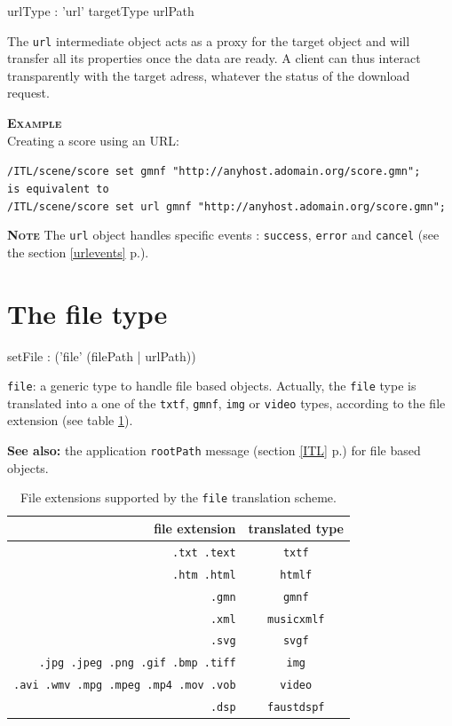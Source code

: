 \documentclass[a4paper,twoside]{report}
\newcommand{\sublevel}[1]	{\section{#1}}
\newcommand{\fullref}[1]	{\ref{#1} p.\pageref{#1}}
\newcommand{\OSC}[1]		{\texttt{#1}}
\newcommand{\example}		{\textbf{\hspace{-1.5cm}\textbf{\textsc{Example }}}}
\newcommand{\note}	[1]		{\vspace{2mm}\textbf{\hspace{-1.03cm}\textbf{\textsc{Note #1}}}}
\renewcommand{\seealso}		{\textbf{See also: }}
\let\olditemize\itemize
\let\oldenditemize\enditemize
\renewenvironment{itemize} 	{\olditemize \setlength{\itemsep}{1mm}}{\oldenditemize}
\newcommand{\sample}	[1]			{\vspace{-2mm}\begin{center}\colorbox{mygrey}{
								\begin{minipage}[t]{0.9\columnwidth} 
								{\small \texttt{#1}}
								\end{minipage}}\end{center}}
\begin{document}
\begin{rail}
urlType : 
	'url' targetType  urlPath
\end{rail}

The \OSC{url} intermediate object acts as a proxy for the target object and will transfer all its properties once the data are ready. A client can thus interact transparently with the target adress, whatever the status of the download request.

\example \\
Creating a score using an URL:
\sample{/ITL/scene/score set gmnf "http://anyhost.adomain.org/score.gmn"; \\
\hspace*{4mm} is equivalent to \\
/ITL/scene/score set url gmnf "http://anyhost.adomain.org/score.gmn";
}

\note{} The \OSC{url} object handles specific events : \OSC{success}, \OSC{error} and \OSC{cancel} (see the section \fullref{urlevents}).


\sublevel{The file type}
\label{fileset}

\label{setfile}
\begin{rail}
setFile : 
	('file' (filePath | urlPath))
\end{rail}

\begin{itemize}
\item \OSC{file}: a generic type to handle file based objects. Actually, the \OSC{file} type is translated into a one of the \OSC{txtf}, \OSC{gmnf}, \OSC{img} or \OSC{video} types, according to the file extension (see table \ref{fileTranslate}).
\end{itemize}

\seealso the application \OSC{rootPath} message (section \fullref{ITL}) for file based objects.

\begin{table}[htdp]
\caption{File extensions supported by the \OSC{file} translation scheme.}
\begin{center}
\begin{tabular}{|r|c|}
\hline
file extension & translated type \\
\hline
\OSC{.txt .text}		& \OSC{txtf} \\
\OSC{.htm .html}		& \OSC{htmlf} \\
\OSC{.gmn}			& \OSC{gmnf} \\
\OSC{.xml}			& \OSC{musicxmlf} \\
\OSC{.svg} 			& \OSC{svgf} \\
\OSC{.jpg .jpeg .png .gif .bmp .tiff} & \OSC{img} \\
\OSC{.avi .wmv .mpg .mpeg .mp4 .mov .vob} & \OSC{video} \\
\OSC{.dsp} 			& \OSC{faustdspf} \\
\hline
\end{tabular}
\end{center}
\label{fileTranslate}
\end{table}
\end{document}
